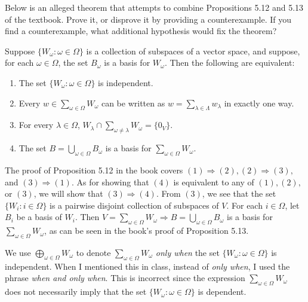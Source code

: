 \begin{problem}
Below is an alleged theorem that attempts to combine Propositions 5.12 and 5.13
of the textbook.  Prove it, or disprove it by providing a counterexample.  If
you find a counterexample, what additional hypothesis would fix the theorem?
\begin{prop}
Suppose $\{W_\omega : \omega \in \Omega\}$ is a collection of subspaces of a vector
space, and suppose, for each $\omega \in \Omega$, the set $B_\omega$ is a
basis for $W_\omega$.  Then the following are equivalent: \\[-0.5em]
\begin{enumerate}
\item The set $\{W_\omega : \omega \in \Omega\}$ is independent.\\[-0.5em]
\item Every $w \in \sum_{\omega \in \Omega}W_\omega$ can be written as 
$w  = \sum_{\lambda \in \Lambda}w_\lambda$ in exactly one way.\\[-0.5em]
\item For every $\lambda \in \Omega$, 
$W_\lambda \cap \sum_{\omega \neq\lambda}W_\omega = \{0_V\}$.\\[-0.5em]
\item The set $B = \bigcup_{\omega \in \Omega} B_\omega$ is a basis for 
$\sum_{\omega \in \Omega}W_\omega$.
\end{enumerate}
\end{prop}
\smallskip

The proof of Proposition 5.12 in the book covers $(1) \Rightarrow (2), (2) \Rightarrow (3),$ and $(3) \Rightarrow (1)$. As for showing that $(4)$ is equivalent to any of $(1), (2),$ or $(3)$, we will show that $(3) \Rightarrow (4)$. From $(3)$, we see that the set $\{W_i : i \in \Omega\}$ is a pairwise disjoint collection of subspaces of $V$. For each $i \in \Omega$, let $B_i$ be a basis of $W_i$. Then $V=\sum_{\omega \in \Omega}W_\omega \Rightarrow B = \bigcup_{\omega \in \Omega} B_\omega$ is a basis for $\sum_{\omega \in \Omega}W_\omega$, as can be seen in the book's proof of Proposition 5.13. 
\end{problem}

\probskip

 We use 
$\bigoplus_{\omega \in \Omega} W_\omega$ to denote 
$\sum_{\omega \in \Omega} W_\omega$ \emph{only when} the set
$\{W_\omega : \omega \in \Omega\}$ is independent.  
When I mentioned this in class, instead of \emph{only when}, I used
the phrase \emph{when and only when}. This is incorrect since the expression
$\sum_{\omega \in \Omega} W_\omega$ does not necessarily imply that the set
$\{W_\omega : \omega \in \Omega\}$ is dependent. 




